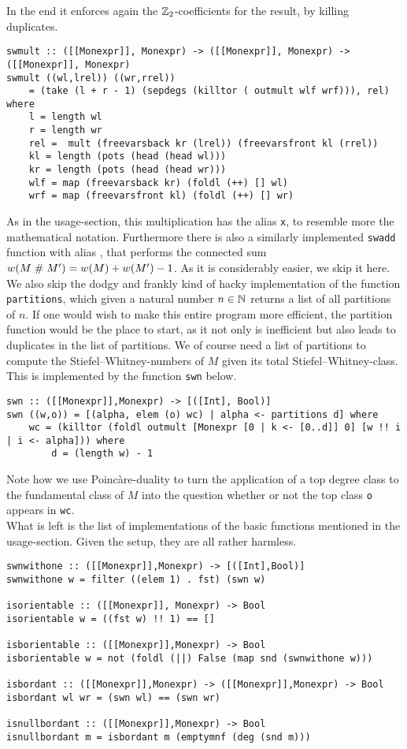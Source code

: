 In the end it enforces again the $\mathbb{Z}_2$-coefficients for the result, by killing duplicates.
\begin{lstlisting}
swmult :: ([[Monexpr]], Monexpr) -> ([[Monexpr]], Monexpr) -> ([[Monexpr]], Monexpr)
swmult ((wl,lrel)) ((wr,rrel)) 
    = (take (l + r - 1) (sepdegs (killtor ( outmult wlf wrf))), rel) where
    l = length wl
    r = length wr
    rel =  mult (freevarsback kr (lrel)) (freevarsfront kl (rrel))
    kl = length (pots (head (head wl))) 
    kr = length (pots (head (head wr))) 
    wlf = map (freevarsback kr) (foldl (++) [] wl)
    wrf = map (freevarsfront kl) (foldl (++) [] wr)
\end{lstlisting}
As in the usage-section, this multiplication has the alias \texttt{x}, to resemble more the mathematical notation.
Furthermore there is also a similarly implemented \texttt{swadd} function with alias , that performs the connected sum $w(M\mathrel\# M^\prime) = w(M) + w(M^\prime) - 1$.
As it is considerably easier, we skip it here.\\
We also skip the dodgy and frankly kind of hacky implementation of the function \texttt{partitions}, which given a natural number $n\in \mathbb{N}$ returns a list of all partitions of $n$.
If one would wish to make this entire program more efficient, the partition function would be the place to start, as it not only is inefficient but also leads to duplicates in the list of partitions.
We of course need a list of partitions to compute the Stiefel--Whitney-numbers of $M$ given its total Stiefel--Whitney-class.
This is implemented by the function \texttt{swn} below.
\begin{lstlisting}
swn :: ([[Monexpr]],Monexpr) -> [([Int], Bool)]
swn ((w,o)) = [(alpha, elem (o) wc) | alpha <- partitions d] where
    wc = (killtor (foldl outmult [Monexpr [0 | k <- [0..d]] 0] [w !! i | i <- alpha])) where
        d = (length w) - 1
\end{lstlisting}
Note how we use Poinc\`are-duality to turn the application of a top degree class to the fundamental class of $M$ into the question whether or not the top class \texttt{o} appears in \texttt{wc}.\\
What is left is the list of implementations of the basic functions mentioned in the usage-section.
Given the setup, they are all rather harmless.
\begin{lstlisting}
swnwithone :: ([[Monexpr]],Monexpr) -> [([Int],Bool)]
swnwithone w = filter ((elem 1) . fst) (swn w)

isorientable :: ([[Monexpr]], Monexpr) -> Bool
isorientable w = ((fst w) !! 1) == []

isborientable :: ([[Monexpr]],Monexpr) -> Bool
isborientable w = not (foldl (||) False (map snd (swnwithone w)))

isbordant :: ([[Monexpr]],Monexpr) -> ([[Monexpr]],Monexpr) -> Bool
isbordant wl wr = (swn wl) == (swn wr)

isnullbordant :: ([[Monexpr]],Monexpr) -> Bool
isnullbordant m = isbordant m (emptymnf (deg (snd m)))
\end{lstlisting}
